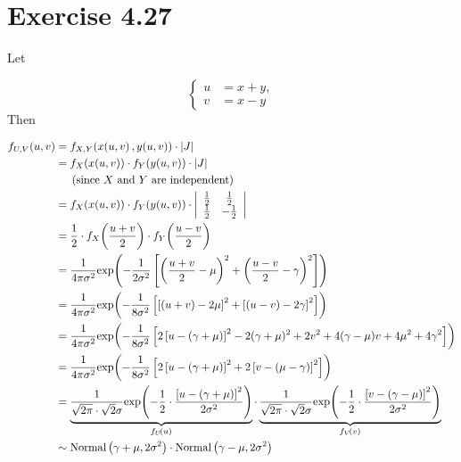 \documentclass[12pt,letterpaper,reqno]{amsart}
\numberwithin{equation}{subsection}
\begin{document}
\newpage
\section{Exercise 4.27}

Let

\[ \left\{ \begin{array}{cc}
     u &= x+y, \\
     v &= x-y
\end{array} \right. \]
Then

\begin{align*}
    \fun{f_{U,V}}{u,v} &= \fun{f_{X,Y}}{\fun{x}{u,v}, \fun{y}{u,v}} \cdot \Abs{J} \\
    &= \fun{f_X}{x(u,v)} \cdot \fun{f_Y}{y(u,v)} \cdot \Abs{J} \\
    & \ \ \ \ \left(\mbox{since $X$ and $Y$ are independent} \right) \\
    &= \fun{f_X}{x(u,v)} \cdot \fun{f_Y}{y(u,v)} \cdot \Abs{\begin{array}{cc}
         \frac{1}{2}& \frac{1}{2}  \\
         \frac{1}{2}& -\frac{1}{2}
    \end{array}} \\
    &= \frac{1}{2} \cdot \fun{f_X}{\frac{u+v}{2}} \cdot \fun{f_Y}{\frac{u-v}{2}} \\
    &= \frac{1}{4\pi \sigma^2} \fun{\exp}{-\frac{1}{2\sigma^2}\left[ \left( \frac{u+v}{2} - \mu \right)^2 + \left( \frac{u-v}{2} - \gamma \right)^2 \right]} \\
    &= \frac{1}{4\pi \sigma^2} \fun{\exp}{-\frac{1}{8\sigma^2} \left[\left[ (u+v) - 2\mu \right]^2 + \left[ (u-v) - 2\gamma \right]^2 \right]} \\
    &= \frac{1}{4\pi \sigma^2} \fun{\exp}{-\frac{1}{8\sigma^2} \left[ 2 \left[ u - (\gamma + \mu) \right]^2 - 2(\gamma + \mu)^2 + 2v^2 + 4(\gamma - \mu)v + 4\mu^2 + 4 \gamma^2 \right]} \\
    &= \frac{1}{4\pi \sigma^2} \fun{\exp}{-\frac{1}{8\sigma^2} \left[ 2 \left[ u - (\gamma + \mu) \right]^2 + 2 \left[ v - (\mu - \gamma) \right]^2 \right]} \\
    &= \underbrace{\frac{1}{ \sqrt{2\pi} \cdot \sqrt{2}\sigma} \fun{\exp}{- \frac{1}{2} \cdot \frac{\left[ u - ( \gamma + \mu) \right]^2}{2 \sigma^2}}}_{\fun{f_U}{u}} \cdot \underbrace{\frac{1}{ \sqrt{2\pi} \cdot \sqrt{2}\sigma} \fun{\exp}{- \frac{1}{2} \cdot \frac{\left[ v - ( \gamma - \mu) \right]^2}{2 \sigma^2}}}_{\fun{f_V}{v}} \\
    &\sim \normaldist{\gamma + \mu, 2\sigma^2} \cdot \normaldist{\gamma - \mu, 2\sigma^2}
\end{align*}
\end{document}
